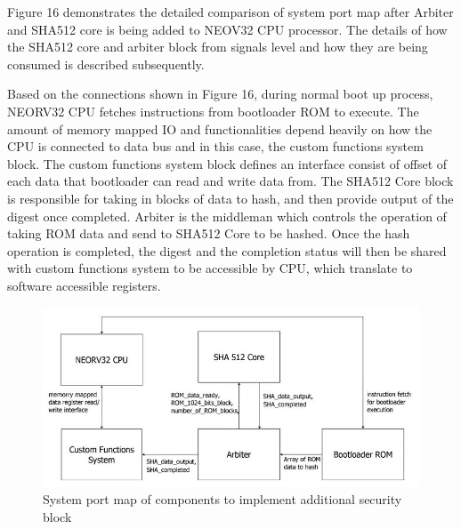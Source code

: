 \documentclass[review]{elsarticle}
\begin{document}
Figure 16 demonstrates the detailed comparison of system port map after Arbiter and SHA512 core is being added to NEOV32 CPU processor. The details of how the SHA512 core and arbiter block from signals level and how they are being consumed is described subsequently.

Based on the connections shown in Figure 16, during normal boot up process, NEORV32 CPU fetches instructions from bootloader ROM to execute. The amount of memory mapped IO and functionalities depend heavily on how the CPU is connected to data bus and in this case, the custom functions system block. The custom functions system block defines an interface consist of offset of each data that bootloader can read and write data from. The SHA512 Core block is responsible for taking in blocks of data to hash, and then provide output of the digest once completed. Arbiter is the middleman which controls the operation of taking ROM data and send to SHA512 Core to be hashed. Once the hash operation is completed, the digest and the completion status will then be shared with custom functions system to be accessible by CPU, which translate to software accessible registers.

\begin{figure}[hbt!]
	\centering
	\includegraphics[width=1\textwidth]{figs/SystemPortMap-Amended.JPG}
	\caption{System port map of components to implement additional security block}
\end{figure}
\end{document}
